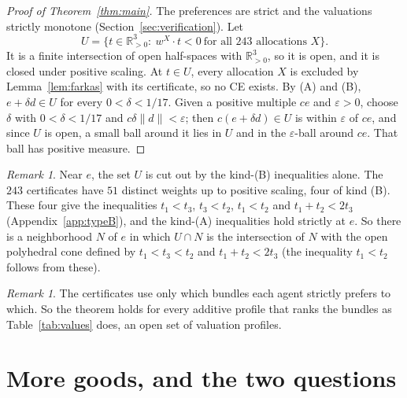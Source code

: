 \documentclass[11pt]{article}
\theoremstyle{definition}
\theoremstyle{remark}
\newtheorem{remark}[theorem]{Remark}
\begin{document}
\begin{proof}[Proof of Theorem~\ref{thm:main}]
The preferences are strict and the valuations strictly monotone
(Section~\ref{sec:verification}). Let
\[
  U=\{t\in\mathbb{R}^3_{>0}:\ w^X\!\cdot t<0\ \text{for all }243\text{ allocations }X\}.
\]
It is a finite intersection of open half-spaces with $\mathbb{R}^3_{>0}$,
so it is open, and it is closed under positive scaling. At $t\in U$, every
allocation $X$ is excluded by Lemma~\ref{lem:farkas} with its certificate,
so no CE exists. By (A) and (B), $e+\delta d\in U$ for every
$0<\delta<1/17$. Given a positive multiple $ce$ and $\varepsilon>0$, choose
$\delta$ with $0<\delta<1/17$ and $c\delta\lVert d\rVert<\varepsilon$; then $c(e+\delta d)\in U$
is within $\varepsilon$ of $ce$, and since $U$ is open, a small ball around
it lies in $U$ and in the $\varepsilon$-ball around $ce$. That ball has
positive measure.
\end{proof}

\begin{remark}\label{rem:cone}
Near $e$, the set $U$ is cut out by the kind-(B) inequalities alone. The
$243$ certificates have $51$ distinct weights up to positive scaling, four
of kind (B). These four give the inequalities $t_1<t_3$, $t_3<t_2$,
$t_1<t_2$ and $t_1+t_2<2t_3$ (Appendix~\ref{app:typeB}), and the kind-(A)
inequalities hold strictly at $e$. So there is a neighborhood $N$ of $e$
in which $U\cap N$ is the intersection of $N$ with the open polyhedral
cone defined by $t_1<t_3<t_2$ and $t_1+t_2<2t_3$ (the inequality
$t_1<t_2$ follows from these).
\end{remark}

\begin{remark}
The certificates use only which bundles each agent strictly prefers to
which. So the theorem holds for every additive profile that ranks the
bundles as Table~\ref{tab:values} does, an open set of valuation profiles.
\end{remark}

\section{More goods, and the two questions}
\end{document}
